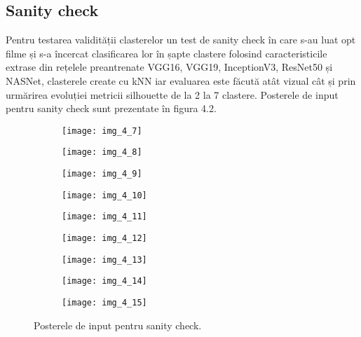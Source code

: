 \subsection{Sanity check}
Pentru testarea validității clasterelor un test de sanity check în care s-au luat opt filme și s-a încercat clasificarea lor în șapte clastere folosind caracteristicile extrase din rețelele preantrenate VGG16, VGG19, InceptionV3, ResNet50 și NASNet, clasterele create cu kNN iar evaluarea este făcută atât vizual cât și prin urmărirea evoluției metricii silhouette de la 2 la 7 clastere. Posterele de input pentru sanity check sunt prezentate în figura 4.2.
\begin{figure}[!tbp]
  \centering
  \begin{subfigure}[b]{0.48\textwidth}
    \texttt{[image: img\_4\_7]}
  \end{subfigure}
  \hfill
  \begin{subfigure}[b]{0.48\textwidth}
    \texttt{[image: img\_4\_8]}
  \end{subfigure}
    \hfill
  \begin{subfigure}[b]{0.48\textwidth}
    \texttt{[image: img\_4\_9]}
  \end{subfigure}
  \hfill
  \begin{subfigure}[b]{0.48\textwidth}
    \texttt{[image: img\_4\_10]}
  \end{subfigure}
  \hfill
  \begin{subfigure}[b]{0.48\textwidth}
    \texttt{[image: img\_4\_11]}
  \end{subfigure}
  \hfill
  \begin{subfigure}[b]{0.48\textwidth}
    \texttt{[image: img\_4\_12]}
  \end{subfigure}
    \hfill
  \begin{subfigure}[b]{0.48\textwidth}
    \texttt{[image: img\_4\_13]}
  \end{subfigure}
    \hfill
  \begin{subfigure}[b]{0.48\textwidth}
    \texttt{[image: img\_4\_14]}
  \end{subfigure}
      \hfill
  \begin{subfigure}[b]{0.3\textwidth}
    \texttt{[image: img\_4\_15]}
  \end{subfigure}
  \caption[Postere input sanity check]{Posterele de input pentru sanity check.}
\end{figure}

